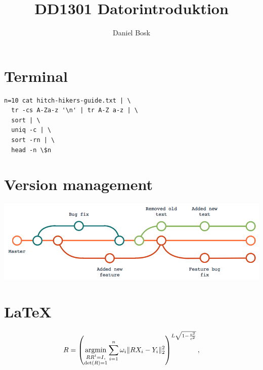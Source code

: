 \title{%
  DD1301 Datorintroduktion
}
\author{Daniel Bosk}


\mode*


\section{Terminal}

\begin{frame}[fragile]
  \begin{lstlisting}[numbers=none]
n=10 cat hitch-hikers-guide.txt | \
  tr -cs A-Za-z '\n' | tr A-Z a-z | \
  sort | \
  uniq -c | \
  sort -rn | \
  head -n \$n
  \end{lstlisting}
\end{frame}


\section{Version management}

\begin{frame}
  \includegraphics[width=\columnwidth]{version-tree.png}
\end{frame}


\section{\LaTeX}

\begin{frame}
\[
  R = \left(\operatorname*{argmin}_{\substack{RR^t=I,\\ \det(R)=1}}
  \sum_{i=1}^n \omega_i 
\lVert RX_i-Y_i\rVert^2_2\right)^{{L}{\sqrt{1-\frac{v^2}{c^2}}}},
\]

\end{frame}

\begin{frame}[fragile]
  
\end{frame}



\begin{frame}[allowframebreaks]
  \printbibliography{}
\end{frame}

